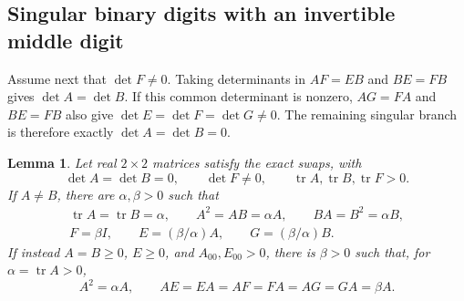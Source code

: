 \documentclass[11pt,a4paper]{article}
\newtheorem{lemma}[theorem]{Lemma}
\newcommand{\tr}{\operatorname{tr}}
\begin{document}
\subsection{Singular binary digits with an invertible middle digit}
Assume next that $\det F\ne0$. Taking determinants in $AF=EB$ and
$BE=FB$ gives $\det A=\det B$. If this common determinant is nonzero,
$AG=FA$ and $BE=FB$ also give
$\det E=\det F=\det G\ne0$. The remaining singular branch is therefore
exactly $\det A=\det B=0$.

\begin{lemma}\label{lem:matrix-singular-binary}
Let real $2\times2$ matrices satisfy the exact swaps, with
\[
\det A=\det B=0,\qquad \det F\ne0,\qquad
\tr A,\tr B,\tr F>0.
\]
If $A\ne B$, there are $\alpha,\beta>0$ such that
\begin{equation}\label{eq:singular-binary-shape}
\begin{gathered}
\tr A=\tr B=\alpha,\qquad
A^2=AB=\alpha A,\qquad BA=B^2=\alpha B,\\
F=\beta I,\qquad E=(\beta/\alpha)A,
\qquad G=(\beta/\alpha)B.
\end{gathered}
\end{equation}
If instead $A=B\ge0$, $E\ge0$, and $A_{00},E_{00}>0$, there is
$\beta>0$ such that, for $\alpha=\tr A>0$,
\begin{equation}\label{eq:equal-singular-actions}
A^2=\alpha A,\qquad
AE=EA=AF=FA=AG=GA=\beta A.
\end{equation}
\end{lemma}
\end{document}
